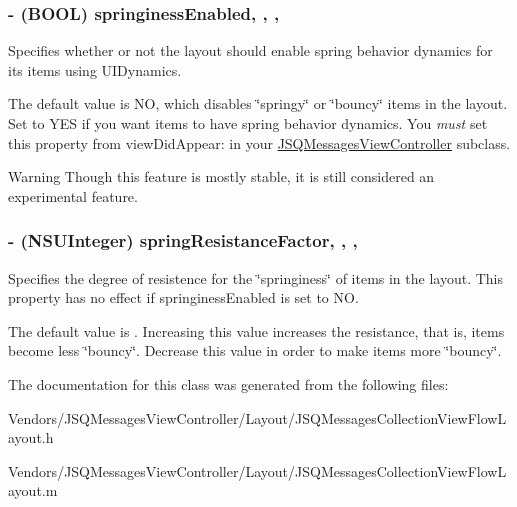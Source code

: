 \subsubsection[{springiness\+Enabled}]{\setlength{\rightskip}{0pt plus 5cm}-\/ (B\+O\+O\+L) springiness\+Enabled\hspace{0.3cm}{\ttfamily [read]}, {\ttfamily [write]}, {\ttfamily [nonatomic]}, {\ttfamily [assign]}}\label{interface_j_s_q_messages_collection_view_flow_layout_aff25c7d92997659fd770b22b2ad6ce69}
Specifies whether or not the layout should enable spring behavior dynamics for its items using {\ttfamily U\+I\+Dynamics}.

The default value is {\ttfamily N\+O}, which disables \char`\"{}springy\char`\"{} or \char`\"{}bouncy\char`\"{} items in the layout. Set to {\ttfamily Y\+E\+S} if you want items to have spring behavior dynamics. You {\itshape must} set this property from {\ttfamily view\+Did\+Appear\+:} in your {\ttfamily \hyperlink{interface_j_s_q_messages_view_controller}{J\+S\+Q\+Messages\+View\+Controller}} subclass.

\begin{DoxyWarning}{Warning}
Though this feature is mostly stable, it is still considered an experimental feature. 
\end{DoxyWarning}
\hypertarget{interface_j_s_q_messages_collection_view_flow_layout_a44700cf3b96675ce91c62d5e957a4ecc}{}
\subsubsection[{spring\+Resistance\+Factor}]{\setlength{\rightskip}{0pt plus 5cm}-\/ (N\+S\+U\+Integer) spring\+Resistance\+Factor\hspace{0.3cm}{\ttfamily [read]}, {\ttfamily [write]}, {\ttfamily [nonatomic]}, {\ttfamily [assign]}}\label{interface_j_s_q_messages_collection_view_flow_layout_a44700cf3b96675ce91c62d5e957a4ecc}
Specifies the degree of resistence for the \char`\"{}springiness\char`\"{} of items in the layout. This property has no effect if {\ttfamily springiness\+Enabled} is set to {\ttfamily N\+O}.

The default value is {}. Increasing this value increases the resistance, that is, items become less \char`\"{}bouncy\char`\"{}. Decrease this value in order to make items more \char`\"{}bouncy\char`\"{}. 

The documentation for this class was generated from the following files\+:\begin{DoxyCompactItemize}
\item 
Vendors/\+J\+S\+Q\+Messages\+View\+Controller/\+Layout/J\+S\+Q\+Messages\+Collection\+View\+Flow\+Layout.\+h\item 
Vendors/\+J\+S\+Q\+Messages\+View\+Controller/\+Layout/J\+S\+Q\+Messages\+Collection\+View\+Flow\+Layout.\+m\end{DoxyCompactItemize}
